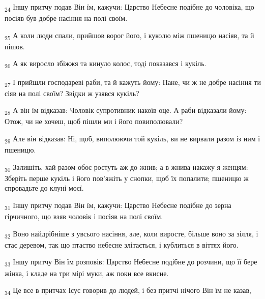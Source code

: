 \begin{tcolorbox}
\textsubscript{24} Іншу притчу подав Він їм, кажучи: Царство Небесне подібне до чоловіка, що посіяв був добре насіння на полі своїм.
\end{tcolorbox}
\begin{tcolorbox}
\textsubscript{25} А коли люди спали, прийшов ворог його, і куколю між пшеницю насіяв, та й пішов.
\end{tcolorbox}
\begin{tcolorbox}
\textsubscript{26} А як виросло збіжжя та кинуло колос, тоді показався і кукіль.
\end{tcolorbox}
\begin{tcolorbox}
\textsubscript{27} І прийшли господареві раби, та й кажуть йому: Пане, чи ж не добре насіння ти сіяв на полі своїм? Звідки ж узявся кукіль?
\end{tcolorbox}
\begin{tcolorbox}
\textsubscript{28} А він їм відказав: Чоловік супротивник накоїв оце. А раби відказали йому: Отож, чи не хочеш, щоб пішли ми і його повиполювали?
\end{tcolorbox}
\begin{tcolorbox}
\textsubscript{29} Але він відказав: Ні, щоб, виполюючи той кукіль, ви не вирвали разом із ним і пшеницю.
\end{tcolorbox}
\begin{tcolorbox}
\textsubscript{30} Залишіть, хай разом обоє ростуть аж до жнив; а в жнива накажу я женцям: Зберіть перше кукіль і його пов'яжіть у снопки, щоб їх попалити; пшеницю ж спровадьте до клуні моєї.
\end{tcolorbox}
\begin{tcolorbox}
\textsubscript{31} Іншу притчу подав Він їм, кажучи: Царство Небесне подібне до зерна гірчичного, що взяв чоловік і посіяв на полі своїм.
\end{tcolorbox}
\begin{tcolorbox}
\textsubscript{32} Воно найдрібніше з увсього насіння, але, коли виросте, більше воно за зілля, і стає деревом, так що птаство небесне злітається, і кублиться в віттях його.
\end{tcolorbox}
\begin{tcolorbox}
\textsubscript{33} Іншу притчу Він їм розповів: Царство Небесне подібне до розчини, що її бере жінка, і кладе на три мірі муки, аж поки все вкисне.
\end{tcolorbox}
\begin{tcolorbox}
\textsubscript{34} Це все в притчах Ісус говорив до людей, і без притчі нічого Він їм не казав,
\end{tcolorbox}
